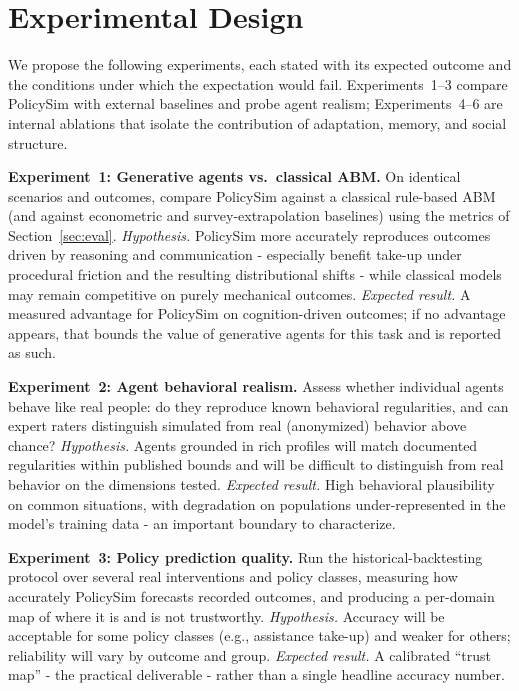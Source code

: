 \documentclass[conference]{IEEEtran}
\begin{document}
\section{Experimental Design}
\label{sec:expdesign}

We propose the following experiments, each stated with its expected outcome and the conditions under which the expectation would fail. Experiments~1--3 compare PolicySim with external baselines and probe agent realism; Experiments~4--6 are internal ablations that isolate the contribution of adaptation, memory, and social structure.

\textbf{Experiment~1: Generative agents vs.\ classical ABM.}
On identical scenarios and outcomes, compare PolicySim against a classical rule-based ABM (and against econometric and survey-extrapolation baselines) using the metrics of Section~\ref{sec:eval}.
\emph{Hypothesis.} PolicySim more accurately reproduces outcomes driven by reasoning and communication - especially benefit take-up under procedural friction and the resulting distributional shifts - while classical models may remain competitive on purely mechanical outcomes.
\emph{Expected result.} A measured advantage for PolicySim on cognition-driven outcomes; if no advantage appears, that bounds the value of generative agents for this task and is reported as such.

\textbf{Experiment~2: Agent behavioral realism.}
Assess whether individual agents behave like real people: do they reproduce known behavioral regularities, and can expert raters distinguish simulated from real (anonymized) behavior above chance?
\emph{Hypothesis.} Agents grounded in rich profiles will match documented regularities within published bounds and will be difficult to distinguish from real behavior on the dimensions tested.
\emph{Expected result.} High behavioral plausibility on common situations, with degradation on populations under-represented in the model's training data - an important boundary to characterize.

\textbf{Experiment~3: Policy prediction quality.}
Run the historical-backtesting protocol over several real interventions and policy classes, measuring how accurately PolicySim forecasts recorded outcomes, and producing a per-domain map of where it is and is not trustworthy.
\emph{Hypothesis.} Accuracy will be acceptable for some policy classes (e.g., assistance take-up) and weaker for others; reliability will vary by outcome and group.
\emph{Expected result.} A calibrated ``trust map'' - the practical deliverable - rather than a single headline accuracy number.
\end{document}
